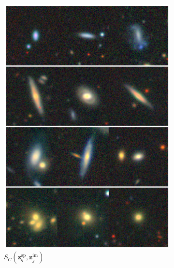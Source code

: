 \documentclass[a4paper,12pt]{article}
\begin{document}
\begin{figure}[H]
\begin{subfigure}{0.22\textwidth}
        \includegraphics[height=0.21\textheight]{../figures/images_im_sp.png}
        \caption{$S_C(\mathbf{z}_q^{\text{sp}}, \mathbf{z}_j^{\text{im}})$}
        \label{fig:retrieval_4}
    \end{subfigure}%
    \hfill
    \begin{subfigure}{0.22\textwidth}
        \centering

\end{subfigure}
\end{figure}
\end{document}
